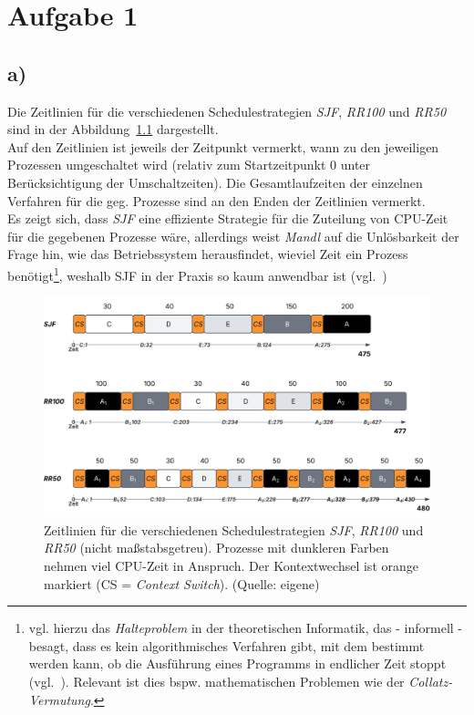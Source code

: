 \chapter{Aufgabe 1}

\section{a)}

Die Zeitlinien für die verschiedenen Schedulestrategien \textit{SJF}, \textit{RR100} und \textit{RR50} sind in der Abbildung~\ref{fig:zeitlinie} dargestellt.\\
Auf den Zeitlinien ist jeweils der Zeitpunkt vermerkt, wann zu den jeweiligen Prozessen umgeschaltet wird (relativ zum Startzeitpunkt $0$ unter Berücksichtigung der Umschaltzeiten).
Die Gesamtlaufzeiten der einzelnen Verfahren für die geg. Prozesse sind an den Enden der Zeitlinien vermerkt.\\

\noindent
Es zeigt sich, dass \textit{SJF} eine effiziente Strategie für die Zuteilung von CPU-Zeit für die gegebenen Prozesse wäre, allerdings weist \textit{Mandl} auf die Unlösbarkeit der Frage hin, wie das Betriebssystem herausfindet, wieviel Zeit ein Prozess benötigt\footnote{
vgl. hierzu das \textit{Halteproblem} in der theoretischen Informatik, das - informell - besagt, dass es kein algorithmisches Verfahren gibt, mit dem bestimmt werden kann, ob die Ausführung eines Programms in endlicher Zeit stoppt (vgl.~\cite[363 ff.]{VW16j}). Relevant ist dies bspw. mathematischen Problemen wie der \textit{Collatz-Vermutung}.
}, weshalb SJF in der Praxis so kaum anwendbar ist (vgl.~\cite[104]{Man20f})

\begin{figure}
    \centering
    \includegraphics[scale=0.35]{aufgabe 1/img/zeitlinie.svg}
    \caption{Zeitlinien für die verschiedenen Schedulestrategien \textit{SJF}, \textit{RR100} und \textit{RR50} (nicht maßstabsgetreu). Prozesse mit dunkleren Farben nehmen viel CPU-Zeit in Anspruch. Der Kontextwechsel ist orange markiert (CS = \textit{Context Switch}). (Quelle: eigene)}
    \label{fig:zeitlinie}
\end{figure}

